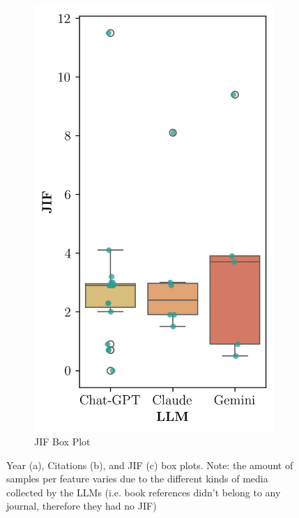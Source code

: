 \documentclass[runningheads]{llncs}
\begin{document}
\begin{figure}[htbp]
\begin{subfigure}[b]{0.32\textwidth}
        \includegraphics[width=\linewidth]{figures/jifs_box_plot.png}
        \caption{JIF Box Plot}
        \label{fig:jif_box_plot}
    \end{subfigure}
    
    \caption{Year (a), Citations (b), and JIF (c) box plots. Note: the amount of samples per feature varies due to the different kinds of media collected by the LLMs (i.e. book references didn't belong to any journal, therefore they had no JIF)}
    \label{fig:grouped_figures}
\end{figure}
\end{document}
